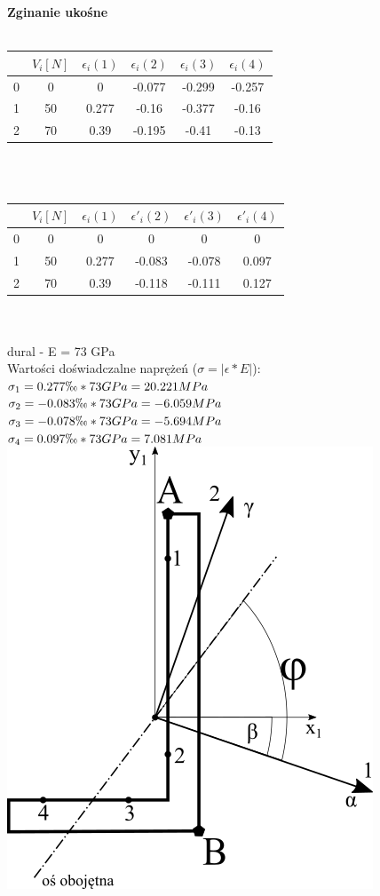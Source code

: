 \documentclass[11pt]{article}
\begin{document}
\textbf{Zginanie ukośne}\\\\
\begin{tabular}{|c|c|c|c|c|c|}\hline
$ $ & $V_i[N]$ & $\epsilon_i(1)$ & $\epsilon_i(2)$ & $\epsilon_i(3)$ & $\epsilon_i(4)$ \\ \hline
0 & 0 & 0 & -0.077 & -0.299 & -0.257 \\ \hline
1 & 50 & 0.277 & -0.16 & -0.377 & -0.16 \\ \hline
2 & 70 & 0.39 & -0.195 & -0.41 & -0.13 \\ \hline
\end{tabular}\\\\
\begin{tabular}{|c|c|c|c|c|c|}\hline
$ $ & $V_i[N]$ & $\epsilon_i(1)$ & $\epsilon'_i(2)$ & $\epsilon'_i(3)$ & $\epsilon'_i(4)$ \\ \hline
0 & 0 & 0 & 0 & 0 & 0 \\ \hline
1 & 50 & 0.277 & -0.083 & -0.078 & 0.097 \\ \hline
2 & 70 & 0.39 & -0.118 & -0.111 & 0.127 \\ \hline
\end{tabular}\\\\
dural - E = 73 GPa\\
Wartości doświadczalne naprężeń ($\sigma = |\epsilon * E|$):\\
$\sigma_1 = 0.277\permil * 73 GPa = 20.221 MPa$\\
$\sigma_2 = -0.083\permil * 73 GPa = -6.059 MPa$\\
$\sigma_3 = -0.078\permil * 73 GPa = -5.694 MPa$\\
$\sigma_4 = 0.097\permil * 73 GPa = 7.081 MPa$\\
\includegraphics{path7520-7.png}\\
\end{document}
